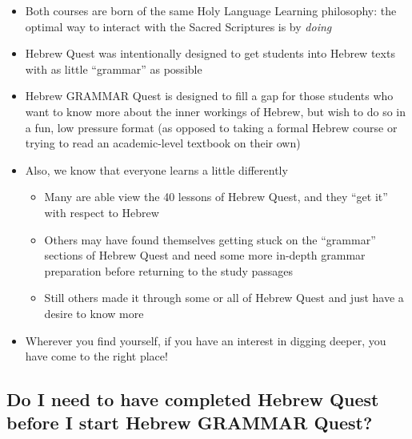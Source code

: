 \documentclass[
]{turabian-researchpaper}
\providecommand{\tightlist}{%
  \setlength{\itemsep}{0pt}\setlength{\parskip}{0pt}}
\begin{document}
\begin{itemize}
\tightlist
\item
  Both courses are born of the same Holy Language Learning philosophy: the optimal way to interact with the Sacred Scriptures is by \emph{doing}
\item
  Hebrew Quest was intentionally designed to get students into Hebrew texts with as little ``grammar'' as possible
\item
  Hebrew GRAMMAR Quest is designed to fill a gap for those students who want to know more about the inner workings of Hebrew, but wish to do so in a fun, low pressure format (as opposed to taking a formal Hebrew course or trying to read an academic-level textbook on their own)
\item
  Also, we know that everyone learns a little differently

  \begin{itemize}
  \tightlist
  \item
    Many are able view the 40 lessons of Hebrew Quest, and they ``get it'' with respect to Hebrew
  \item
    Others may have found themselves getting stuck on the ``grammar'' sections of Hebrew Quest and need some more in-depth grammar preparation before returning to the study passages
  \item
    Still others made it through some or all of Hebrew Quest and just have a desire to know more
  \end{itemize}
\item
  Wherever you find yourself, if you have an interest in digging deeper, you have come to the right place!
\end{itemize}

\hypertarget{do-i-need-to-have-completed-hebrew-quest-before-i-start-hebrew-grammar-quest}{%
\subsection*{Do I need to have completed Hebrew Quest before I start Hebrew GRAMMAR Quest?}\label{do-i-need-to-have-completed-hebrew-quest-before-i-start-hebrew-grammar-quest}}
\end{document}
